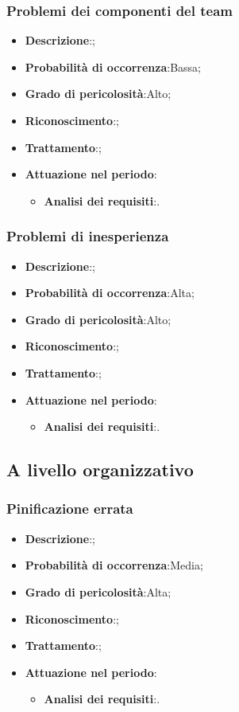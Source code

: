 		\subsubsection{Problemi dei componenti del team}
		\begin{itemize}
			\item \textbf{Descrizione}:;
			\item \textbf{Probabilità di occorrenza}:Bassa;
			\item \textbf{Grado di pericolosità}:Alto;
			\item \textbf{Riconoscimento}:;
			\item \textbf{Trattamento}:;
			\item \textbf{Attuazione nel periodo}:
			\begin{itemize}
				\item \textbf{Analisi dei requisiti}:.
			\end{itemize}
		\end{itemize}
		
		\subsubsection{Problemi di inesperienza}
		\begin{itemize}
			\item \textbf{Descrizione}:;
			\item \textbf{Probabilità di occorrenza}:Alta;
			\item \textbf{Grado di pericolosità}:Alto;
			\item \textbf{Riconoscimento}:;	
			\item \textbf{Trattamento}:;
			\item \textbf{Attuazione nel periodo}:
			\begin{itemize}
				\item \textbf{Analisi dei requisiti}:.
			\end{itemize}
		\end{itemize}
	
	\subsection{A livello organizzativo}
		
		\subsubsection{Pinificazione errata}
		\begin{itemize}
			\item \textbf{Descrizione}:;
			\item \textbf{Probabilità di occorrenza}:Media;
			\item \textbf{Grado di pericolosità}:Alta;
			\item \textbf{Riconoscimento}:;	
			\item \textbf{Trattamento}:;
			\item \textbf{Attuazione nel periodo}:
			\begin{itemize}
				\item \textbf{Analisi dei requisiti}:.
			\end{itemize}
		\end{itemize}
	
